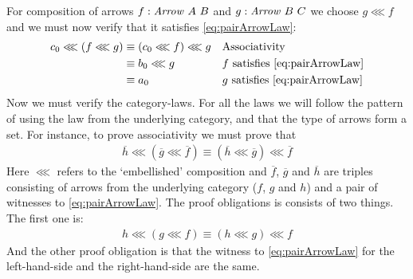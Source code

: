 For composition of arrows $f \tp \Arrow\ A\ B$ and $g \mathrel{:} \mathit{Arrow}\ B\ C$ we
choose $g \lll f$ and we must now verify that it satisfies
\ref{eq:pairArrowLaw}:
%
\begin{align*}
  c_0 \lll (f \lll g)
  & \equiv
  (c_0 \lll f) \lll g
  && \text{Associativity} \\
  & \equiv
  b_0 \lll g
  && \text{$f$ satisfies \ref{eq:pairArrowLaw}} \\
  & \equiv
  a_0
  && \text{$g$ satisfies \ref{eq:pairArrowLaw}} \\
\end{align*}
%
Now we must verify the category-laws. For all the laws we will follow the
pattern of using the law from the underlying category, and that the type of
arrows form a set. For instance, to prove associativity we must prove that
%
\begin{align}
\label{eq:productAssoc}
\overline{h} \lll (\overline{g} \lll \overline{f})
\equiv
(\overline{h} \lll \overline{g}) \lll \overline{f}
\end{align}
%
Here $\lll$ refers to the `embellished' composition and $\overline{f}$,
$\overline{g}$ and $\overline{h}$ are triples consisting of arrows from the
underlying category ($f$, $g$ and $h$) and a pair of witnesses to
\ref{eq:pairArrowLaw}.
The proof obligations is consists of two things. The first one is:
%
\begin{align}
\label{eq:productAssocUnderlying}
h \lll (g \lll f)
\equiv
(h \lll g) \lll f
\end{align}
%
And the other proof obligation is that the witness to \ref{eq:pairArrowLaw} for
the left-hand-side and the right-hand-side are the same.

